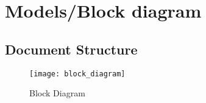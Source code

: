 \chapter{Models/Block diagram}

\section{Document Structure}

\begin{figure}[h!]
	\centering
	\texttt{[image: block\_diagram]}
	\caption{Block Diagram}
	\label{blockDiagram}
\end{figure}
